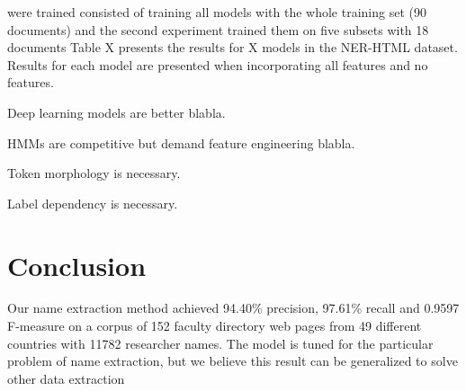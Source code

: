 \documentclass[sigconf]{acmart}
\begin{document}
were trained 
consisted of training
all models with the whole training set (90 documents) and the second experiment trained
them on five subsets with 18 documents
Table X presents the results for X models in the NER-HTML dataset. Results
for each model are presented when incorporating all features and no features.

Deep learning models are better blabla.

HMMs are competitive but demand feature engineering blabla.

Token morphology is necessary.

Label dependency is necessary.

\section{Conclusion}

Our name extraction method achieved 94.40\% precision, 97.61\% recall 
and 0.9597 F-measure on a corpus of 152 faculty directory web pages from
49 different countries with 11782 researcher names. 
The model is tuned for the particular problem of name extraction, 
but we believe this result can be generalized to solve other data extraction 
\end{document}
